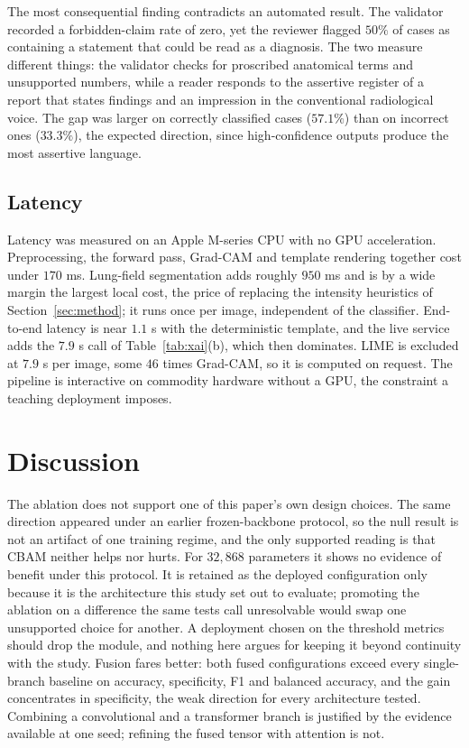 \documentclass[conference]{IEEEtran}
\begin{document}
The most consequential finding contradicts an automated result. The
validator recorded a forbidden-claim rate of zero, yet the reviewer flagged
$50\%$ of cases as containing a statement that could be read as a diagnosis.
The two measure different things: the validator checks for proscribed
anatomical terms and unsupported numbers, while a reader responds to the
assertive register of a report that states findings and an impression in the
conventional radiological voice. The gap was larger on correctly classified
cases ($57.1\%$) than on incorrect ones ($33.3\%$), the expected direction,
since high-confidence outputs produce the most assertive language.



\subsection{Latency}
Latency was measured on an Apple M-series CPU with no GPU acceleration.
Preprocessing, the forward pass, Grad-CAM and template rendering together
cost under $170$ ms. Lung-field segmentation adds roughly $950$ ms and is by
a wide margin the largest local cost, the price of replacing the intensity
heuristics of Section~\ref{sec:method}; it runs once per image, independent
of the classifier. End-to-end latency is near $1.1$ s with the deterministic
template, and the live service adds the $7.9$ s call of
Table~\ref{tab:xai}(b), which then dominates. LIME is excluded at $7.9$ s per
image, some $46$ times Grad-CAM, so it is computed on request. The pipeline
is interactive on commodity hardware without a GPU, the constraint a
teaching deployment imposes.

\section{Discussion}
The ablation does not support one of this paper's own design choices. The
same direction appeared under an earlier frozen-backbone protocol, so the
null result is not an artifact of one training regime, and the only
supported reading is that CBAM neither helps nor hurts. For $32{,}868$
parameters it shows no evidence of benefit under this protocol. It is retained as
the deployed configuration only because it is the architecture this study
set out to evaluate; promoting the ablation on a difference the same tests
call unresolvable would swap one unsupported choice for another. A
deployment chosen on the threshold metrics should drop the module, and
nothing here argues for keeping it beyond continuity with the study. Fusion fares better: both fused configurations
exceed every single-branch baseline on accuracy, specificity, F1 and
balanced accuracy, and the gain concentrates in specificity, the weak
direction for every architecture tested. Combining a convolutional and a
transformer branch is justified by the evidence available at one seed;
refining the fused tensor with attention is not.
\end{document}
